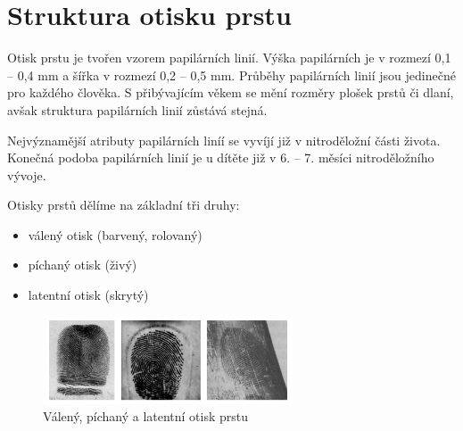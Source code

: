 \section{Struktura otisku prstu}
Otisk prstu je tvořen vzorem papilárních linií. Výška papilárních je v rozmezí 0,1 -- 0,4 mm a šířka v rozmezí 0,2 -- 0,5 mm. \cite{Drahansky} Průběhy papilárních linií jsou jedinečné pro každého člověka. S přibývajícím věkem se mění rozměry plošek prstů či dlaní, avšak struktura papilárních linií zůstává stejná.

Nejvýznamější atributy papilárních liníí se vyvíjí již v nitroděložní části života. Konečná podoba papilárních linií je u dítěte již v 6. -- 7. měsíci nitroděložního vývoje. \cite{DrahanskyBrezinova}

Otisky prstů dělíme na základní tři druhy: \cite{Drahansky}
\begin{itemize}
\item válený otisk (barvený, rolovaný)
\item píchaný otisk (živý)
\item latentní otisk (skrytý)
\end{itemize}

\begin{figure}[!htbp]
    \centering
    \includegraphics[width=280px]{obrazky-figures/druhyotisk.png}
    \caption{Válený, píchaný a latentní otisk prstu \cite{Drahansky}}
\end{figure}

